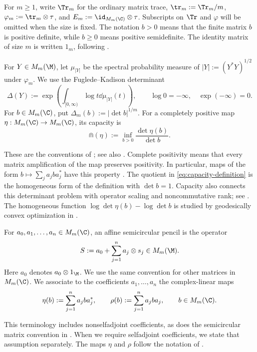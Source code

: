 For $m\ge1$, write $\Tr_m$ for the ordinary matrix trace, $\tr_m:=\Tr_m/m$, $\varphi_m:=\tr_m\otimes\tau$, and $E_m:=\id_{M_m(\C)}\otimes\tau$.
Subscripts on $\Tr$ and $\varphi$ will be omitted when the size is fixed.
The notation $b>0$ means that the finite matrix $b$ is positive definite, while $b\ge0$ means positive semidefinite.
The identity matrix of size $m$ is written $1_m$, following \cite[Section 2.2]{MS24}.

\begin{definition}\label{def:determinant-capacity}
For $Y\in M_m(\M)$, let $\mu_{|Y|}$ be the spectral probability measure of $|Y|:=(Y^*Y)^{1/2}$ under $\varphi_m$.
We use the Fuglede--Kadison determinant
\begin{equation}\label{eq:fk-definition}
 \Delta(Y):=\exp\left(\int_{[0,\infty)}\log t\dd\mu_{|Y|}(t)\right),
 \qquad \log0=-\infty,\quad \exp(-\infty)=0.
\end{equation}
For $b\in M_m(\C)$, put $\Delta_m(b):=|\det b|^{1/m}$.
For a completely positive map $\eta:M_m(\C)\to M_m(\C)$, its capacity is
\begin{equation}\label{eq:capacity-definition}
 \Cap(\eta):=\inf_{b>0}\frac{\det\eta(b)}{\det b}.
\end{equation}
\end{definition}
These are the conventions of \cite[Definitions 1.1 and 2.1]{MS24};
see also \cite{FK52,Gur04}.
Complete positivity means that every matrix amplification of the map preserves positivity.
In particular, maps of the form $b\mapsto\sum_j a_jba_j^*$ have this property \cite[Section 2.2]{MS24}.
The quotient in \eqref{eq:capacity-definition} is the homogeneous form of the definition with $\det b=1$.
Capacity also connects this determinant problem with operator scaling and noncommutative rank; see \cite[Sections 1.1--1.3]{GGOW20}.
The homogeneous function $\log\det\eta(b)-\log\det b$ is studied by geodesically convex optimization in \cite[Section 1.1]{AZGL+18}.

\begin{definition}\label{def:affine-pencil}
For $a_0,a_1,\ldots,a_n\in M_m(\C)$, an affine semicircular pencil is the operator
\begin{equation}\label{eq:affine-pencil}
 S:=a_0+\sum_{j=1}^n a_j\otimes s_j\in M_m(\M).
\end{equation}
Here $a_0$ denotes $a_0\otimes1_{\M}$.
We use the same convention for other matrices in $M_m(\C)$.
We associate to the coefficients $a_1,\ldots,a_n$ the complex-linear maps
\begin{equation}\label{eq:coefficient-maps}
 \eta(b):=\sum_{j=1}^n a_jba_j^*,\qquad
 \rho(b):=\sum_{j=1}^n a_jba_j,
 \qquad b\in M_m(\C).
\end{equation}
\end{definition}
This terminology includes nonselfadjoint coefficients, as does the semicircular matrix convention in \cite[p.~3]{MS24}.
When we require selfadjoint coefficients, we state that assumption separately.
The maps $\eta$ and $\rho$ follow the notation of \cite[Theorem 1.2 and Lemma 3.5(ii)]{MS24}.


